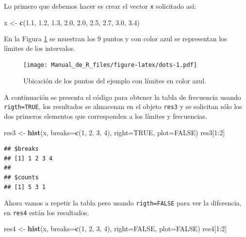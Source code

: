\documentclass[10pt,]{krantz}
\makeatletter
\newenvironment{Shaded}{\begin{snugshade}}{\end{snugshade}}
\newcommand{\KeywordTok}[1]{\textcolor[rgb]{0.13,0.29,0.53}{\textbf{{#1}}}}
\newcommand{\DataTypeTok}[1]{\textcolor[rgb]{0.13,0.29,0.53}{{#1}}}
\newcommand{\DecValTok}[1]{\textcolor[rgb]{0.00,0.00,0.81}{{#1}}}
\newcommand{\FloatTok}[1]{\textcolor[rgb]{0.00,0.00,0.81}{{#1}}}
\newcommand{\StringTok}[1]{\textcolor[rgb]{0.31,0.60,0.02}{{#1}}}
\newcommand{\OtherTok}[1]{\textcolor[rgb]{0.56,0.35,0.01}{{#1}}}
\newcommand{\NormalTok}[1]{{#1}}
\newenvironment{kframe}{%
\medskip{}
\setlength{\fboxsep}{.8em}
 \def\at@end@of@kframe{}%
 \ifinner\ifhmode%
  \def\at@end@of@kframe{\end{minipage}}%
  \begin{minipage}{\columnwidth}%
 \fi\fi%
 \def\FrameCommand##1{\hskip\@totalleftmargin \hskip-\fboxsep
 \colorbox{shadecolor}{##1}\hskip-\fboxsep
     \hskip-\linewidth \hskip-\@totalleftmargin \hskip\columnwidth}%
 \MakeFramed {\advance\hsize-\width
   \@totalleftmargin\z@ \linewidth\hsize
   \@setminipage}}%
 {\par\unskip\endMakeFramed%
 \at@end@of@kframe}
\renewenvironment{Shaded}{\begin{kframe}}{\end{kframe}}
\makeatother
\begin{document}
Lo primero que debemos hacer es crear el vector \texttt{x} solicitado
así:

\begin{Shaded}
\begin{Highlighting}[]
\NormalTok{x <-}\StringTok{ }\KeywordTok{c}\NormalTok{(}\FloatTok{1.1}\NormalTok{, }\FloatTok{1.2}\NormalTok{, }\FloatTok{1.3}\NormalTok{, }\FloatTok{2.0}\NormalTok{, }\FloatTok{2.0}\NormalTok{, }\FloatTok{2.5}\NormalTok{, }\FloatTok{2.7}\NormalTok{, }\FloatTok{3.0}\NormalTok{, }\FloatTok{3.4}\NormalTok{)}
\end{Highlighting}
\end{Shaded}

En la Figura \ref{fig:dots} se muestran los 9 puntos y con color azul se
representan los límites de los intervalos.

\begin{figure}[htbp]
\centering
\texttt{[image: Manual\_de\_R\_files/figure-latex/dots-1.pdf]}
\caption{\label{fig:dots}Ubicación de los puntos del ejemplo con límites en
color azul.}
\end{figure}

A continuación se presenta el código para obtener la tabla de frecuencia
usando \texttt{rigth=TRUE}, los resultados se almacenan en el objeto
\texttt{res3} y se solicitan sólo los dos primeros elementos que
corresponden a los límites y frecuencias.

\begin{Shaded}
\begin{Highlighting}[]
\NormalTok{res3 <-}\StringTok{ }\KeywordTok{hist}\NormalTok{(x, }\DataTypeTok{breaks=}\KeywordTok{c}\NormalTok{(}\DecValTok{1}\NormalTok{, }\DecValTok{2}\NormalTok{, }\DecValTok{3}\NormalTok{, }\DecValTok{4}\NormalTok{), }\DataTypeTok{right=}\OtherTok{TRUE}\NormalTok{, }\DataTypeTok{plot=}\OtherTok{FALSE}\NormalTok{)}
\NormalTok{res3[}\DecValTok{1}\NormalTok{:}\DecValTok{2}\NormalTok{]}
\end{Highlighting}
\end{Shaded}

\begin{verbatim}
## $breaks
## [1] 1 2 3 4
## 
## $counts
## [1] 5 3 1
\end{verbatim}

Ahora vamos a repetir la tabla pero usando \texttt{rigth=FALSE} para ver
la diferencia, en \texttt{res4} están los resultados.

\begin{Shaded}
\begin{Highlighting}[]
\NormalTok{res4 <-}\StringTok{ }\KeywordTok{hist}\NormalTok{(x, }\DataTypeTok{breaks=}\KeywordTok{c}\NormalTok{(}\DecValTok{1}\NormalTok{, }\DecValTok{2}\NormalTok{, }\DecValTok{3}\NormalTok{, }\DecValTok{4}\NormalTok{), }\DataTypeTok{right=}\OtherTok{FALSE}\NormalTok{, }\DataTypeTok{plot=}\OtherTok{FALSE}\NormalTok{)}
\NormalTok{res4[}\DecValTok{1}\NormalTok{:}\DecValTok{2}\NormalTok{]}
\end{Highlighting}
\end{Shaded}
\end{document}
